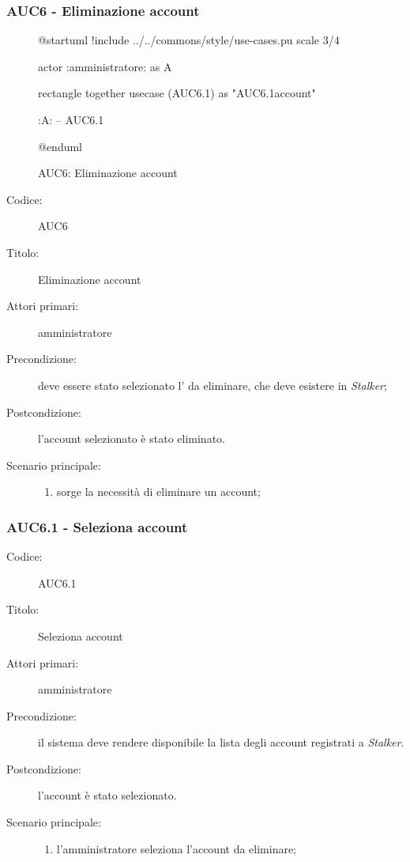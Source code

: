 \documentclass[../analisi-dei-requisiti.tex]{subfiles}
\begin{document}
\subsubsection{AUC6 - Eliminazione account}%
\label{subsub:AUC6}

\begin{figure}[h!]
  \centering
  \begin{plantuml}
  @startuml
  !include ../../commons/style/use-cases.pu
  scale 3/4

  actor :amministratore: as A

  rectangle {
    together {
      usecase (AUC6.1) as "AUC6.1\nSeleziona account"
    }
  }

  :A: -- AUC6.1

  @enduml
  \end{plantuml}
  \caption{AUC6: Eliminazione account}
  \label{fig:auc6}
\end{figure}

\begin{description}
  \item[Codice:] AUC6
  \item[Titolo:] Eliminazione account
  \item[Attori primari:] amministratore
  \item[Precondizione:] deve essere stato selezionato l' da eliminare, che deve esistere in \emph{Stalker};
  \item[Postcondizione:] l'account selezionato è stato eliminato.
  \item[Scenario principale:]
  \begin{enumerate}
    \item sorge la necessità di eliminare un account;
  \end{enumerate}
\end{description}

\subsubsection{AUC6.1 - Seleziona account}%
\label{subsub:AUC6.1}
\begin{description}
  \item[Codice:] AUC6.1
  \item[Titolo:] Seleziona account
  \item[Attori primari:] amministratore
  \item[Precondizione:] il sistema deve rendere disponibile la lista degli account registrati a \emph{Stalker}.
  \item[Postcondizione:] l'account è stato selezionato.
  \item[Scenario principale:]
  \begin{enumerate}
    \item l'amministratore seleziona l'account da eliminare;
  \end{enumerate}
\end{description}
\end{document}
